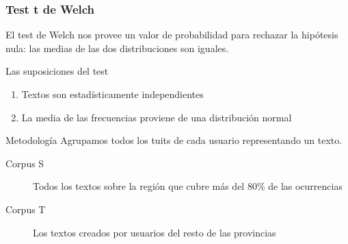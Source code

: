 \begin{frame}[c]\frametitle{Test t de Welch}

   El test de Welch nos provee un valor de probabilidad para rechazar la hipótesis nula: las medias de las dos distribuciones son iguales.

   
       Las suposiciones del test 
        \begin{enumerate}
            \item Textos son estadísticamente independientes 
            \item La media de las frecuencias proviene de una distribución normal
        \end{enumerate}
  
       \begin{block}{Metodología}
              Agrupamos todos los tuits de cada usuario representando un texto.
        \begin{description}
            \item[Corpus S] Todos los textos sobre la región que cubre más del 80\% de las ocurrencias
            \item[Corpus T] Los textos creados por usuarios del resto de las provincias
        \end{description}

        \end{block}
\end{frame}


